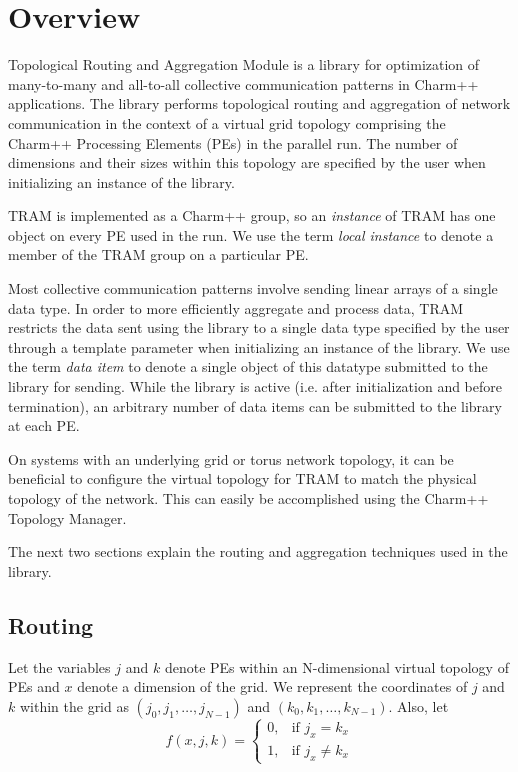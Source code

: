 \newcommand{\code}[1]{\textsf{#1}}

\section{Overview}

Topological Routing and Aggregation Module is a library for optimization of
many-to-many and all-to-all collective communication patterns in Charm++
applications. The library performs topological routing and aggregation of
network communication in the context of a virtual grid topology comprising the
Charm++ Processing Elements (PEs) in the parallel run. The number of dimensions
and their sizes within this topology are specified by the user when initializing
an instance of the library.

TRAM is implemented as a Charm++ group, so an \emph{instance}
of TRAM has one object on every PE used in the run. We use
the term \emph{local instance} to denote a member of the TRAM
group on a particular PE.

Most collective communication patterns involve sending linear arrays
of a single data type. In order to more efficiently aggregate and
process data, TRAM restricts the data sent using the
library to a single data type specified by the user through a template
parameter when initializing an instance of the library. We use the
term \emph{data item} to denote a single object of this datatype
submitted to the library for sending. While the library is active
(i.e. after initialization and before termination), an arbitrary
number of data items can be submitted to the library at each PE.

On systems with an underlying grid or torus network topology, it can be
beneficial to configure the virtual topology for TRAM to match the physical
topology of the network. This can easily be accomplished using the Charm++
Topology Manager.

The next two sections explain the routing and aggregation techniques
used in the library.

\subsection{Routing}

Let the variables $j$ and $k$ denote PEs within an N-dimensional
virtual topology of PEs and $x$ denote a dimension of the grid. We
represent the coordinates of $j$ and $k$ within the grid as $\left
(j_0, j_1, \ldots, j_{N-1} \right) $ and $ \left (k_0, k_1, \ldots,
k_{N-1} \right) $.  Also, let
\[
f(x, j, k) =
\begin{cases}
0, & \text{if } j_x = k_x \\
1, & \text{if } j_x \ne k_x
\end{cases}
\]

